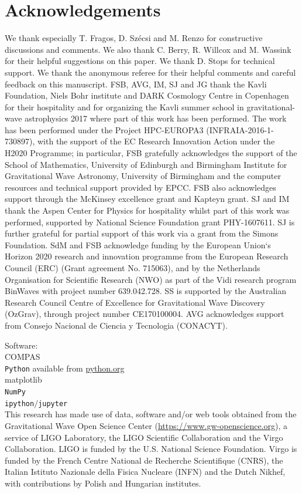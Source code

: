 \documentclass[a4paper,fleqn,usenatbib,useAMS,usedcolumn]{mnras}
\begin{document}
\section*{Acknowledgements}
We thank especially  T. Fragos, D. Sz\'{e}csi  and  M. Renzo for constructive discussions and comments. We also thank C. Berry, R. Willcox and M. Wassink for their helpful suggestions on this paper.   We thank D. Stops for technical support. We thank the anonymous referee for their helpful comments and careful feedback on this manuscript.
FSB, AVG, IM, SJ and JG thank the  Kavli Foundation, Niels Bohr institute and DARK Cosmology Centre in Copenhagen for their hospitality and for organizing the Kavli summer school in gravitational-wave astrophysics 2017 where part of this work has been performed.  
The work has been performed under the Project HPC-EUROPA3 (INFRAIA-2016-1-730897), with the support of the EC Research Innovation Action under the H2020 Programme; in particular, FSB gratefully acknowledges the support of the School of Mathematics, University of Edinburgh and Birmingham Institute for Gravitational Wave Astronomy,  University of Birmingham and the computer resources and technical support provided by EPCC. 
FSB also acknowledges support  through the McKinsey excellence grant and Kapteyn grant. 
SJ and IM thank the Aspen Center for Physics for hospitality whilst part of this work was performed, supported by National Science Foundation grant PHY-1607611. SJ is further grateful for partial support of this work via a grant from the Simons Foundation.
SdM and FSB acknowledge funding by the European Union`s Horizon 2020 research and innovation programme from the European Research Council (ERC) (Grant agreement No. 715063), and by the Netherlands Organisation for Scientific Research (NWO) as part of the Vidi research program BinWaves with project number 639.042.728.
SS is supported by the Australian Research Council Centre of Excellence for Gravitational Wave Discovery (OzGrav), through project number CE170100004.
AVG acknowledges support from Consejo Nacional de Ciencia y Tecnologia (CONACYT). 

Software: \\
\textsc{COMPAS}  \citep{stevenson2017formation, 2018MNRAS.477.4685B, 2018MNRAS.481.4009V}\\  \texttt{Python} available from \url{python.org}\\ matplotlib \citep{2007CSE.....9...90H}\\  \texttt{NumPy} \citep{2011CSE....13b..22V}\\ \texttt{ipython$/$jupyter} \citep{2007CSE.....9c..21P, kluyver2016jupyter} \\
This research has made use of data, software and/or web tools obtained from the Gravitational Wave Open Science Center (\url{https://www.gw-openscience.org}), a service of LIGO Laboratory, the LIGO Scientific Collaboration and the Virgo Collaboration. LIGO is funded by the U.S. National Science Foundation. Virgo is funded by the French Centre National de Recherche Scientifique (CNRS), the Italian Istituto Nazionale della Fisica Nucleare (INFN) and the Dutch Nikhef, with contributions by Polish and Hungarian institutes.
\end{document}
